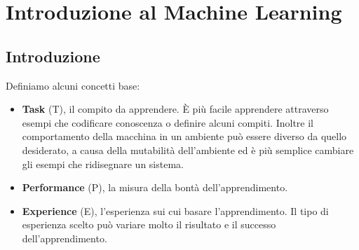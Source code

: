 \chapter{Introduzione al Machine Learning}
\section{Introduzione}
Definiamo alcuni concetti base:
\begin{itemize}
    \item \textbf{Task} (T), il compito da apprendere. È più facile apprendere
          attraverso esempi che codificare conoscenza o definire alcuni compiti.
          Inoltre il comportamento della macchina in un ambiente può essere diverso da
          quello desiderato, a causa della mutabilità dell'ambiente ed è più semplice
          cambiare gli esempi che ridisegnare un sistema.
    \item \textbf{Performance} (P), la misura della bontà dell'apprendimento.
    \item \textbf{Experience} (E), l'esperienza sui cui basare l'apprendimento.
          Il tipo di esperienza scelto può variare molto il risultato e il successo
          dell'apprendimento.
\end{itemize}

